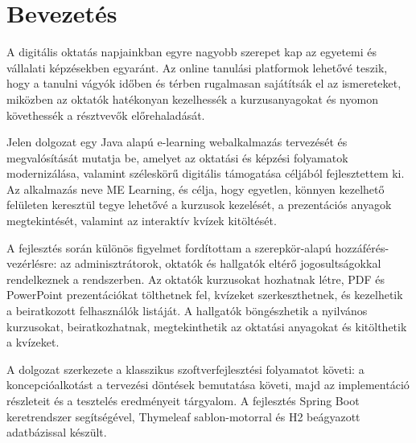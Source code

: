 \chapter{Bevezetés}

A digitális oktatás napjainkban egyre nagyobb szerepet kap az egyetemi és vállalati képzésekben egyaránt. Az online tanulási platformok lehetővé teszik, hogy a tanulni vágyók időben és térben rugalmasan sajátítsák el az ismereteket, miközben az oktatók hatékonyan kezelhessék a kurzusanyagokat és nyomon követhessék a résztvevők előrehaladását.

Jelen dolgozat egy Java alapú e-learning webalkalmazás tervezését és megvalósítását mutatja be, amelyet az oktatási és képzési folyamatok modernizálása, valamint széleskörű digitális támogatása céljából fejlesztettem ki. Az alkalmazás neve ME Learning, és célja, hogy egyetlen, könnyen kezelhető felületen keresztül tegye lehetővé a kurzusok kezelését, a prezentációs anyagok megtekintését, valamint az interaktív kvízek kitöltését.

A fejlesztés során különös figyelmet fordítottam a szerepkör-alapú hozzáférés-vezérlésre: az adminisztrátorok, oktatók és hallgatók eltérő jogosultságokkal rendelkeznek a rendszerben. Az oktatók kurzusokat hozhatnak létre, PDF és PowerPoint prezentációkat tölthetnek fel, kvízeket szerkeszthetnek, és kezelhetik a beiratkozott felhasználók listáját. A hallgatók böngészhetik a nyilvános kurzusokat, beiratkozhatnak, megtekinthetik az oktatási anyagokat és kitölthetik a kvízeket.

A dolgozat szerkezete a klasszikus szoftverfejlesztési folyamatot követi: a koncepcióalkotást a tervezési döntések bemutatása követi, majd az implementáció részleteit és a tesztelés eredményeit tárgyalom. A fejlesztés Spring Boot keretrendszer segítségével, Thymeleaf sablon-motorral és H2 beágyazott adatbázissal készült.
